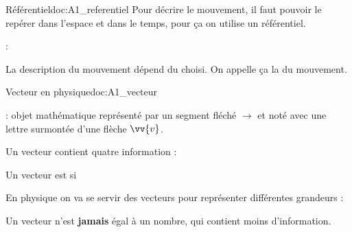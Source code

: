\begin{doc}{Référentiel}{doc:A1_referentiel}
  Pour décrire le mouvement, il faut pouvoir le repérer dans l’espace et dans le temps, pour ça on utilise un référentiel.
  
  \begin{encart}
     : 
  \end{encart}
  
  \begin{encart}
    La description du mouvement dépend du  choisi.
    On appelle ça la  du mouvement.
  \end{encart}
\end{doc}



\begin{doc}{Vecteur en physique}{doc:A1_vecteur}
  \begin{encart}
     : objet mathématique représenté par un segment fléché $\longrightarrow$ et noté avec une lettre surmontée d'une flèche $\vv{v}$.
    
    Un vecteur contient quatre information : 
    \begin{listePoints}
      \item {}
      \item {}
      \item \texteTrou{}
      \item \dotfill 
    \end{listePoints}
  
    Un vecteur est  si
  \end{encart}
  
  \fleche En physique on va se servir des vecteurs pour représenter différentes grandeurs :
  
  \attention Un vecteur n'est \textbf{jamais} égal à un nombre, qui contient moins d'information.
\end{doc}